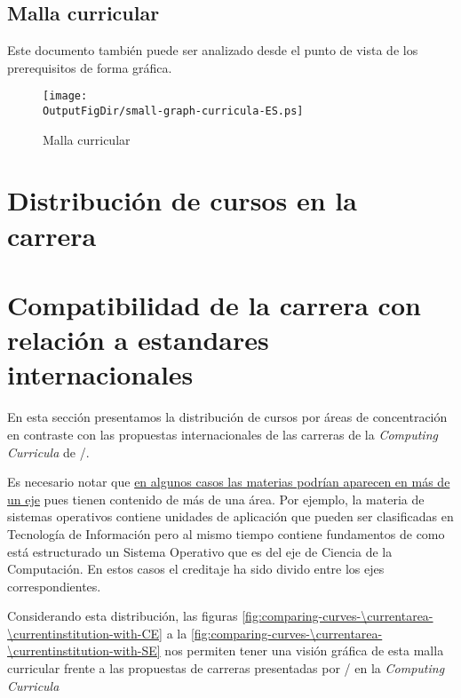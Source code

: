 \begin{landscape}



\section{Malla curricular}\label{sec:vision-grafica}
\vspace{-0.3cm}Este documento también puede ser analizado desde el punto de vista de los prerequisitos de forma gráfica.
\begin{figure}[H]
      \texttt{[image: \\OutputFigDir/small-graph-curricula-ES.ps]}
      \label{fig:malla-curricular}
      \caption{Malla curricular \SchoolFullName}
\end{figure}
\end{landscape}



\section{Distribución de cursos en la carrera}

\section{Compatibilidad de la carrera con relación a estandares internacionales}
En esta sección presentamos la distribución de cursos por áreas de concentración en 
contraste con las propuestas internacionales de las carreras de la \textit{Computing Curricula} 
de /.

Es necesario notar que \underline{en algunos casos las materias podrían aparecen en más de un eje} 
pues tienen contenido de más de una área. 
Por ejemplo, la materia de sistemas operativos contiene unidades de aplicación 
que pueden ser clasificadas en Tecnología de Información pero al mismo tiempo contiene fundamentos 
de como está estructurado un Sistema Operativo que es del eje de Ciencia de la Computación. 
En estos casos el creditaje ha sido divido entre los ejes correspondientes.


Considerando esta distribución, las figuras \ref{fig:comparing-curves-\currentarea-\currentinstitution-with-CE} 
a la \ref{fig:comparing-curves-\currentarea-\currentinstitution-with-SE} 
nos permiten tener una visión gráfica de esta malla curricular frente a las propuestas de 
carreras presentadas por / en la \textit{Computing Curricula}

